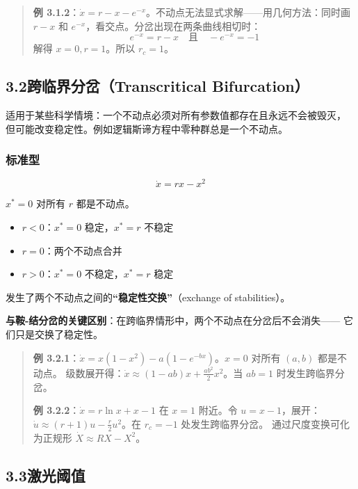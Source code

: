 \documentclass[12pt,a4paper]{article}
\begin{document}
\begin{quote}
\textbf{例 3.1.2}：$\dot{x} = r - x - e^{-x}$。不动点无法显式求解——用几何方法：同时画
$r - x$ 和 $e^{-x}$，看交点。分岔出现在两条曲线相切时：
\[
e^{-x} = r - x \quad\text{且}\quad -e^{-x} = -1
\]
解得 $x = 0, r = 1$。所以 $r_c = 1$。
\end{quote}

\subsection{3.2\quad 跨临界分岔（Transcritical Bifurcation）}

适用于某些科学情境：一个不动点必须对所有参数值都存在且永远不会被毁灭，
但可能改变稳定性。例如逻辑斯谛方程中零种群总是一个不动点。

\subsubsection{标准型}
\begin{equation}
\dot{x} = rx - x^2
\end{equation}

$x^* = 0$ 对所有 $r$ 都是不动点。
\begin{itemize}[nosep]
  \item $r < 0$：$x^* = 0$ 稳定，$x^* = r$ 不稳定
  \item $r = 0$：两个不动点合并
  \item $r > 0$：$x^* = 0$ 不稳定，$x^* = r$ 稳定
\end{itemize}
发生了两个不动点之间的\textbf{``稳定性交换''}（exchange of stabilities）。

\textbf{与鞍-结分岔的关键区别}：在跨临界情形中，两个不动点在分岔后不会消失——
它们只是交换了稳定性。

\begin{quote}
\textbf{例 3.2.1}：$\dot{x} = x(1 - x^2) - a(1 - e^{-bx})$。$x = 0$ 对所有 $(a,b)$ 都是不动点。
级数展开得：$\dot{x} \approx (1 - ab)x + \frac{ab^2}{2}x^2$。当 $ab = 1$ 时发生跨临界分岔。

\medskip
\textbf{例 3.2.2}：$\dot{x} = r\ln x + x - 1$ 在 $x = 1$ 附近。令 $u = x - 1$，展开：
$\dot{u} \approx (r + 1)u - \frac{r}{2}u^2$。在 $r_c = -1$ 处发生跨临界分岔。
通过尺度变换可化为正规形 $\dot{X} \approx RX - X^2$。
\end{quote}

\subsection{3.3\quad 激光阈值}
\end{document}

